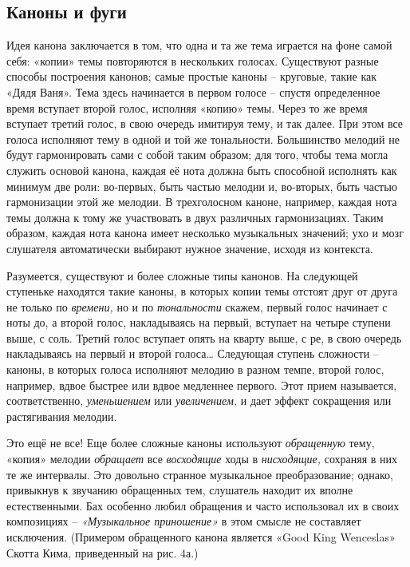 \documentclass[../main.tex]{subfiles}
\begin{document}
\subsection{Каноны и фуги}

Идея канона заключается в том, что одна и та же тема играется на фоне самой себя: «копии» темы повторяются в нескольких голосах. Существуют разные способы построения канонов; самые простые каноны \--- круговые, такие как «Дядя Ваня». Тема здесь начинается в первом голосе \--- спустя определенное время вступает второй голос, исполняя «копию» темы. Через то же время вступает третий голос, в свою очередь имитируя тему, и так далее. При этом все голоса исполняют тему в одной и той же тональности. Большинство мелодий не будут гармонировать сами с собой таким образом; для того, чтобы тема могла служить основой канона, каждая её нота должна быть способной исполнять как минимум две роли: во-первых, быть частью мелодии и, во-вторых, быть частью гармонизации этой же мелодии. В трехголосном каноне, например, каждая нота темы должна к тому же участвовать в двух различных гармонизациях. Таким образом, каждая нота канона имеет несколько музыкальных значений; ухо и мозг слушателя автоматически выбирают нужное значение, исходя из контекста.

Разумеется, существуют и более сложные типы канонов. На следующей ступеньке находятся такие каноны, в которых копии темы отстоят друг от друга не только по \emph{времени,} но и по \emph{тональности} скажем, первый голос начинает с ноты до, а второй голос, накладываясь на первый, вступает на четыре ступени выше, с соль. Третий голос вступает опять на кварту выше, с ре, в свою очередь накладываясь на первый и второй голоса\ldots{} Следующая ступень сложности \--- каноны, в которых голоса исполняют мелодию в разном темпе, второй голос, например, вдвое быстрее или вдвое медленнее первого. Этот прием называется, соответственно, \emph{уменьшением} или \emph{увеличением,} и дает эффект сокращения или растягивания мелодии.

Это ещё не все! Еще более сложные каноны используют \emph{обращенную} тему, «копия» мелодии \emph{обращает} все \emph{восходящие} ходы в \emph{нисходящие,} сохраняя в них те же интервалы. Это довольно странное музыкальное преобразование; однако, привыкнув к звучанию обращенных тем, слушатель находит их вполне естественными. Бах особенно любил обращения и часто использовал их в своих композициях \--- \emph{«Музыкальное приношение»} в этом смысле не составляет исключения. (Примером обращенного канона является «Good King Wenceslas» Скотта Кима, приведенный на рис. 4а.)
\end{document}
